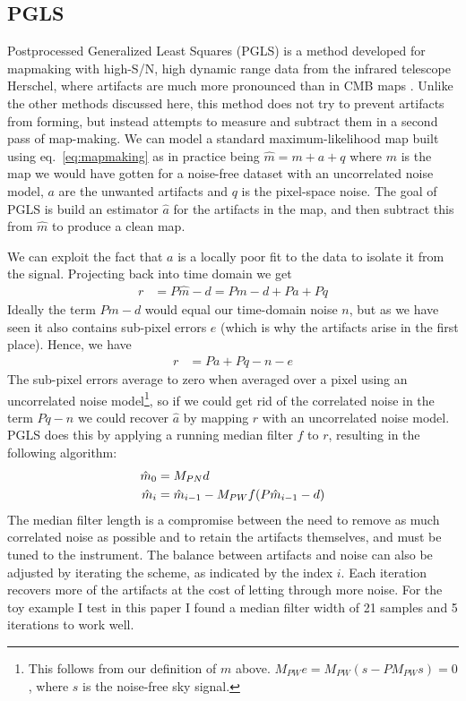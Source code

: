 \documentclass{article}
\begin{document}
\subsection{PGLS}
Postprocessed Generalized Least Squares (PGLS) is a method developed for mapmaking with
high-S/N, high dynamic range data from the infrared telescope Herschel, where artifacts
are much more pronounced than in CMB maps \citep{pgls-2012}. Unlike the other methods discussed here, this method
does not try to prevent artifacts from forming, but instead attempts to measure and subtract
them in a second pass of map-making. We can model a standard maximum-likelihood map built
using eq.~\ref{eq:mapmaking} as in practice being $\hat m = m + a + q$ where $m$ is the
map we would have gotten for a noise-free dataset with an uncorrelated noise model,
$a$ are the unwanted artifacts and $q$ is the pixel-space noise.
The goal of PGLS is build an estimator $\hat a$ for the artifacts in the map, and then subtract
this from $\hat m$ to produce a clean map.

We can exploit the fact that $a$ is a locally poor fit to the data to isolate it from the signal.
Projecting back into time domain we get 
\begin{align}
	r &= P\hat m - d = Pm - d + Pa + Pq
\end{align}
Ideally the term $Pm-d$ would equal our time-domain noise $n$, but as we have seen it
also contains sub-pixel errors $e$ (which is why the artifacts arise in the first place).
Hence, we have
\begin{align}
	r &= Pa + Pq - n - e
\end{align}
The sub-pixel errors average to zero when averaged over a pixel using an uncorrelated noise model\footnote{
	This follows from our definition of $m$ above. $M_{PW}e = M_{PW}(s - PM_{PW}s) = 0$, where $s$ is the noise-free sky signal.}, so if we could get rid of the
correlated noise in the term $Pq-n$ we could recover $\hat a$ by mapping $r$ with an uncorrelated
noise model. PGLS does this by applying a running median filter $f$ to $r$, resulting in the following
algorithm:
\begin{align}
	\hat m_0 &= M_{PN} d \notag \\
	\hat m_i &= \hat m_{i-1} - M_{PW} f(P\hat m_{i-1} - d)
\end{align}
The median filter length is a compromise between the need to remove as much correlated noise as
possible and to retain the artifacts themselves, and must be tuned to the instrument. The balance
between artifacts and noise can also be adjusted by iterating the scheme, as indicated by the
index $i$. Each iteration recovers more of the artifacts at the cost of letting through more noise.
For the toy example I test in this paper I found a median filter width of 21 samples and 5 iterations
to work well.
\end{document}
